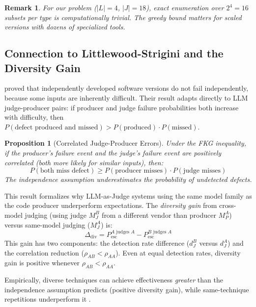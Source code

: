 \documentclass[11pt, a4paper, logo, copyright]{googledeepmind}
\newtheorem{proposition}{Proposition}[section]
\newtheorem*{remark}{Remark}
\begin{document}
\begin{remark}
For our problem ($|L| = 4$, $|J| = 18$), exact enumeration over $2^4 = 16$ subsets per type is computationally trivial. The greedy bound matters for scaled versions with dozens of specialized tools.
\end{remark}

\subsection{Connection to Littlewood-Strigini and the Diversity Gain}

\citet{littlewood1993, littlewood2000} proved that independently developed software versions do not fail independently, because some inputs are inherently difficult. Their result adapts directly to LLM judge-producer pairs: if producer and judge failure probabilities both increase with difficulty, then $P(\text{defect produced and missed}) > P(\text{produced}) \cdot P(\text{missed})$.

\begin{proposition}[Correlated Judge-Producer Errors]
\label{prop:fkg}
Under the FKG inequality, if the producer's failure event and the judge's failure event are positively correlated (both more likely for similar inputs), then:
\begin{equation}
    P(\text{both miss defect}) \geq P(\text{producer misses}) \cdot P(\text{judge misses})
\end{equation}
The independence assumption \emph{underestimates} the probability of undetected defects.
\end{proposition}

This result formalizes why LLM-as-Judge systems using the same model family as the code producer underperform expectations. The \emph{diversity gain} from cross-model judging (using judge $M_J^B$ from a different vendor than producer $M_P^A$) versus same-model judging ($M_J^A$) is:
\begin{equation}
\Delta_{\mathrm{div}} = P_{\mathrm{esc}}^{A \text{ judges } A} - P_{\mathrm{esc}}^{B \text{ judges } A}
\end{equation}
This gain has two components: the detection rate difference ($d_J^B$ versus $d_J^A$) and the correlation reduction ($\rho_{AB} < \rho_{AA}$). Even at equal detection rates, diversity gain is positive whenever $\rho_{AB} < \rho_{AA}$.

Empirically, diverse techniques can achieve effectiveness \emph{greater} than the independence assumption predicts (positive diversity gain), while same-technique repetitions underperform it \citep{littlewood2000}.
\end{document}
